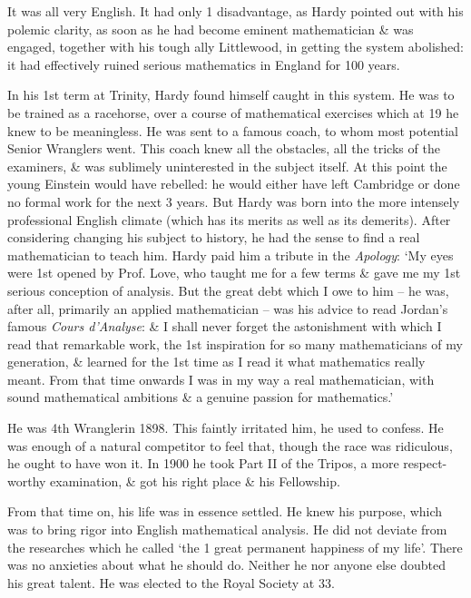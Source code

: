 \documentclass{article}
\numberwithin{equation}{section}
\begin{document}
It was all very English. It had only 1 disadvantage, as Hardy pointed out with his polemic clarity, as soon as he had become eminent mathematician \& was engaged, together with his tough ally Littlewood, in getting the system abolished: it had effectively ruined serious mathematics in England for 100 years.

In his 1st term at Trinity, Hardy found himself caught in this system. He was to be trained as a racehorse, over a course of mathematical exercises which at 19 he knew to be meaningless. He was sent to a famous coach, to whom most potential Senior Wranglers went. This coach knew all the obstacles, all the tricks of the examiners, \& was sublimely uninterested in the subject itself. At this point the young Einstein would have rebelled: he would either have left Cambridge or done no formal work for the next 3 years. But Hardy was born into the more intensely professional English climate (which has its merits as well as its demerits). After considering changing his subject to history, he had the sense to find a real mathematician to teach him. Hardy paid him a tribute in the \textit{Apology}: `My eyes were 1st opened by Prof. Love, who taught me for a few terms \& gave me my 1st serious conception of analysis. But the great debt which I owe to him -- he was, after all, primarily an applied mathematician -- was his advice to read Jordan's famous \textit{Cours d'Analyse}: \& I shall never forget the astonishment with which I read that remarkable work, the 1st inspiration for so many mathematicians of my generation, \& learned for the 1st time as I read it what mathematics really meant. From that time onwards I was in my way a real mathematician, with sound mathematical ambitions \& a genuine passion for mathematics.'

He was 4th Wranglerin 1898. This faintly irritated him, he used to confess. He was enough of a natural competitor to feel that, though the race was ridiculous, he ought to have won it. In 1900 he took Part II of the Tripos, a more respect-worthy examination, \& got his right place \& his Fellowship.

From that time on, his life was in essence settled. He knew his purpose, which was to bring rigor into English mathematical analysis. He did not deviate from the researches which he called `the 1 great permanent happiness of my life'. There was no anxieties about what he should do. Neither he nor anyone else doubted his great talent. He was elected to the Royal Society at 33.
\end{document}
